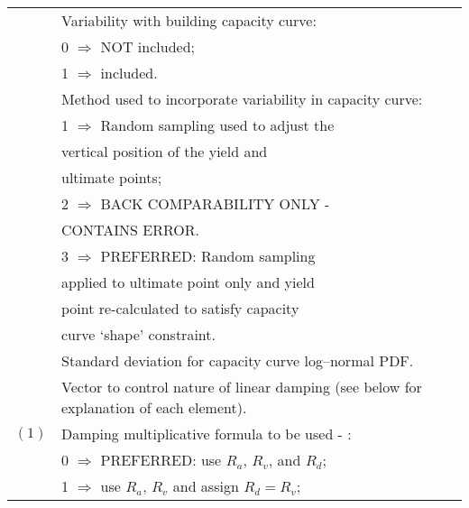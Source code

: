 \documentclass[a4paper, 12pt]{report}
\begin{document}
\begin{supertabular}{lp{0.6\textwidth}}
   &   Variability with building capacity curve: \\
 & \hspace{0.5em} 0 $\Rightarrow$ NOT included; \\
 & \hspace{0.5em}  1 $\Rightarrow$ included.    \\
 & Method used to incorporate variability in capacity curve: \\
 & \hspace{0.5em} 1 $\Rightarrow$ Random sampling used to adjust the \\
& \hspace{2.8em} vertical position of the yield and \\
& \hspace{2.8em} ultimate points; \\
 & \hspace{0.5em} 2 $\Rightarrow$ \small{BACK COMPARABILITY ONLY - } \\
& \hspace{2.8em} \small{CONTAINS ERROR}. \\
 & \hspace{0.5em} 3 $\Rightarrow$ \small{PREFERRED}: Random sampling \\
& \hspace{2.8em} applied to ultimate point only and yield \\
& \hspace{2.8em}  point re-calculated to satisfy capacity \\
& \hspace{2.8em}  curve `shape' constraint. \\
  & Standard deviation for capacity curve log--normal PDF.      \\
  & Vector to control nature of linear damping (see below for explanation of each element). \\
$(1)$ & Damping multiplicative formula to
be
used - : \\
 & \hspace{0.5em} 0 $\Rightarrow$ \small{PREFERRED}: use $R_a$, $R_v$, and $R_d$; \\
 & \hspace{0.5em} 1 $\Rightarrow$ use $R_a$, $R_v$ and assign $R_d= R_v$; \\

\end{supertabular}
\end{document}
